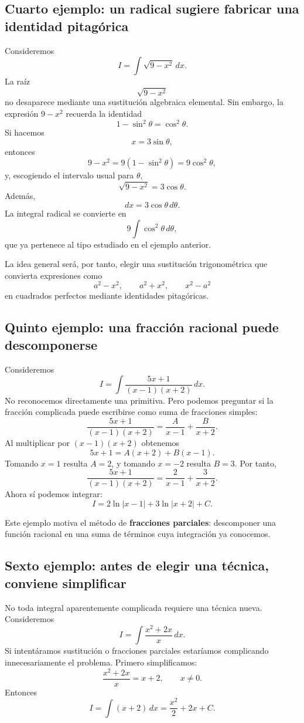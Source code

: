 \documentclass[12pt]{article}
\theoremstyle{definition}
\theoremstyle{remark}
\begin{document}
\subsection*{Cuarto ejemplo: un radical sugiere fabricar una identidad pitagórica}
Consideremos
\[
I=\int\sqrt{9-x^2}\,dx.
\]
La raíz
\[
\sqrt{9-x^2}
\]
no desaparece mediante una sustitución algebraica elemental. Sin embargo, la expresión $9-x^2$ recuerda la identidad
\[
1-\sin^2\theta=\cos^2\theta.
\]
Si hacemos
\[
x=3\sin\theta,
\]
entonces
\[
9-x^2=9(1-\sin^2\theta)=9\cos^2\theta,
\]
y, escogiendo el intervalo usual para $\theta$,
\[
\sqrt{9-x^2}=3\cos\theta.
\]
Además,
\[
dx=3\cos\theta\,d\theta.
\]
La integral radical se convierte en
\[
9\int\cos^2\theta\,d\theta,
\]
que ya pertenece al tipo estudiado en el ejemplo anterior.

La idea general será, por tanto, elegir una sustitución trigonométrica que convierta expresiones como
\[
a^2-x^2,\qquad a^2+x^2,\qquad x^2-a^2
\]
en cuadrados perfectos mediante identidades pitagóricas.

\subsection*{Quinto ejemplo: una fracción racional puede descomponerse}
Consideremos
\[
I=\int\frac{5x+1}{(x-1)(x+2)}\,dx.
\]
No reconocemos directamente una primitiva. Pero podemos preguntar si la fracción complicada puede escribirse como suma de fracciones simples:
\[
\frac{5x+1}{(x-1)(x+2)}
=\frac{A}{x-1}+\frac{B}{x+2}.
\]
Al multiplicar por $(x-1)(x+2)$ obtenemos
\[
5x+1=A(x+2)+B(x-1).
\]
Tomando $x=1$ resulta $A=2$, y tomando $x=-2$ resulta $B=3$. Por tanto,
\[
\frac{5x+1}{(x-1)(x+2)}=\frac2{x-1}+\frac3{x+2}.
\]
Ahora sí podemos integrar:
\[
I=2\ln|x-1|+3\ln|x+2|+C.
\]

Este ejemplo motiva el método de \textbf{fracciones parciales}: descomponer una función racional en una suma de términos cuya integración ya conocemos.

\subsection*{Sexto ejemplo: antes de elegir una técnica, conviene simplificar}
No toda integral aparentemente complicada requiere una técnica nueva. Consideremos
\[
I=\int\frac{x^2+2x}{x}\,dx.
\]
Si intentáramos sustitución o fracciones parciales estaríamos complicando innecesariamente el problema. Primero simplificamos:
\[
\frac{x^2+2x}{x}=x+2,\qquad x\neq0.
\]
Entonces
\[
I=\int(x+2)\,dx
=\boxed{\frac{x^2}{2}+2x+C}.
\]
\end{document}
